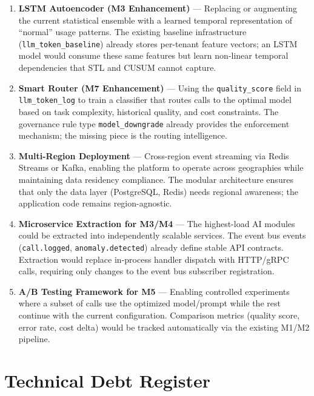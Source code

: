 \documentclass[12pt,a4paper,twoside]{report}
\begin{document}
\begin{enumerate}
  \item \textbf{LSTM Autoencoder (M3 Enhancement)} — Replacing or augmenting the current statistical ensemble with a learned temporal representation of ``normal'' usage patterns. The existing baseline infrastructure (\texttt{llm\_token\_baseline}) already stores per-tenant feature vectors; an LSTM model would consume these same features but learn non-linear temporal dependencies that STL and CUSUM cannot capture.

  \item \textbf{Smart Router (M7 Enhancement)} — Using the \texttt{quality\_score} field in \texttt{llm\_token\_log} to train a classifier that routes calls to the optimal model based on task complexity, historical quality, and cost constraints. The governance rule type \texttt{model\_downgrade} already provides the enforcement mechanism; the missing piece is the routing intelligence.

  \item \textbf{Multi-Region Deployment} — Cross-region event streaming via Redis Streams or Kafka, enabling the platform to operate across geographies while maintaining data residency compliance. The modular architecture ensures that only the data layer (PostgreSQL, Redis) needs regional awareness; the application code remains region-agnostic.

  \item \textbf{Microservice Extraction for M3/M4} — The highest-load AI modules could be extracted into independently scalable services. The event bus events (\texttt{call.logged}, \texttt{anomaly.detected}) already define stable API contracts. Extraction would replace in-process handler dispatch with HTTP/gRPC calls, requiring only changes to the event bus subscriber registration.

  \item \textbf{A/B Testing Framework for M5} — Enabling controlled experiments where a subset of calls use the optimized model/prompt while the rest continue with the current configuration. Comparison metrics (quality score, error rate, cost delta) would be tracked automatically via the existing M1/M2 pipeline.
\end{enumerate}

\section{Technical Debt Register}
\end{document}
